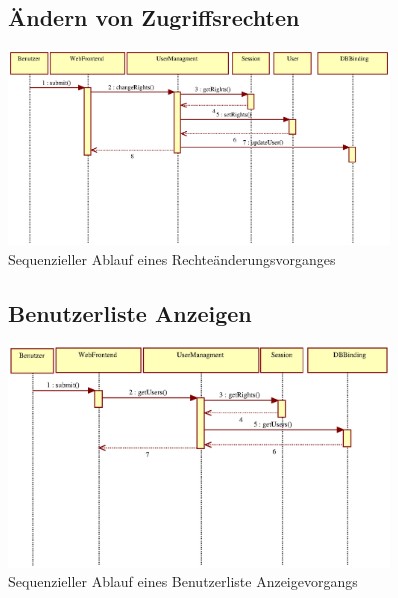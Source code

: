 \documentclass[a4paper,11pt]{scrartcl}
\begin{document}
\begin{figure}[htbp]
\subsection{Ändern von Zugriffsrechten}
		\centering
		\includegraphics[width=0.90\textwidth]{images/seq07_KontoRechteAendern.eps}
		\caption{Sequenzieller Ablauf eines Rechteänderungsvorganges}
		\label{seq07}
\end{figure}


\begin{figure}[htbp]
\subsection{Benutzerliste Anzeigen}
		\centering
		\includegraphics[width=0.90\textwidth]{images/seq08_benutzerlisteAnzeigen.eps}
		\caption{Sequenzieller Ablauf eines Benutzerliste Anzeigevorgangs}
		\label{seq08}
\end{figure}
\end{document}
